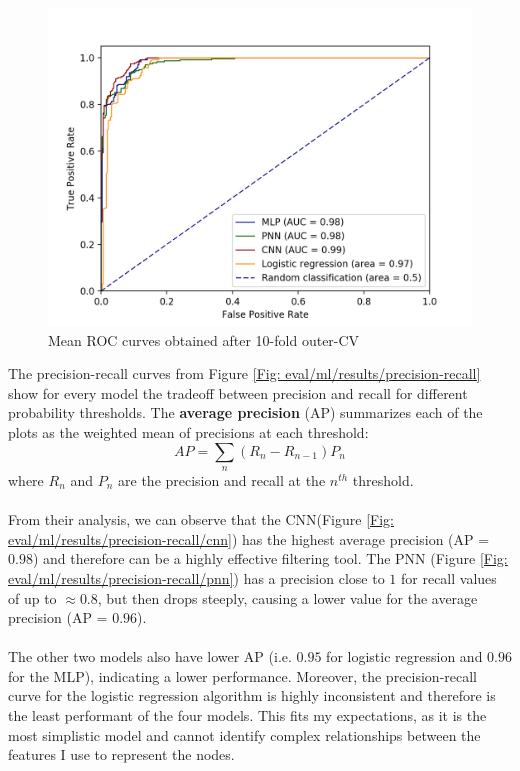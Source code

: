 		\begin{figure}[H]
			\centering
			\includegraphics[width=\textwidth]{graphics/ROC-curve}
			\caption{Mean ROC curves obtained after 10-fold outer-CV}
			\label{Fig: eval/ml/results/ROC}
		\end{figure}
		The precision-recall curves from Figure \ref{Fig: eval/ml/results/precision-recall} show for every model the tradeoff between precision and recall for different probability thresholds. The \textbf{average precision} (AP) summarizes each of the plots as the weighted mean of precisions at each threshold:
		\begin{equation}
			AP = \sum_{n} (R_n - R_{n-1}) P_n
		\end{equation}
		where $R_n$ and $P_n$ are the precision and recall at the $n^{th}$ threshold. 
		\\ \\
		From their analysis, we can observe that the CNN(Figure \ref{Fig: eval/ml/results/precision-recall/cnn}) has the highest average precision (AP = $0.98$) and therefore can be a highly effective filtering tool. The PNN (Figure \ref{Fig: eval/ml/results/precision-recall/pnn}) has a precision close to $1$ for recall values of up to $\approx 0.8$, but then drops steeply, causing a lower value for the average precision (AP = $0.96$). 
		\\ \\
		The other two models also have lower AP (i.e. $0.95$ for logistic regression and $0.96$ for the MLP), indicating a lower performance. Moreover, the precision-recall curve for the logistic regression algorithm is highly inconsistent and therefore is the least performant of the four models. This fits my expectations, as it is the most simplistic model and cannot identify complex relationships between the features I use to represent the nodes.
